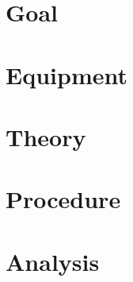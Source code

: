 \documentclass[main.tex]{subfiles}
\begin{document}
\section*{Goal}

\section*{Equipment}

\section*{Theory}

\section*{Procedure}

\section*{Analysis}
\end{document}
